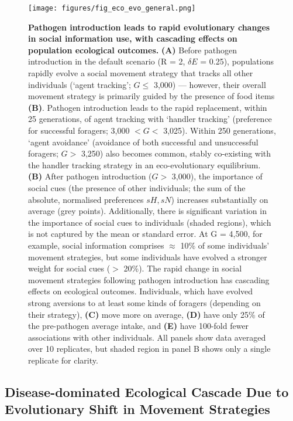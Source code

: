 \begin{figure}[!h]
    \centering
    \texttt{[image: figures/fig\_eco\_evo\_general.png]}
    \caption{
        \textbf{Pathogen introduction leads to rapid evolutionary changes in social information use, with cascading effects on population ecological outcomes.}
        \textbf{(A)} Before pathogen introduction in the default scenario (R = 2, $\delta E$ = 0.25), populations rapidly evolve a social movement strategy that tracks all other individuals (`agent tracking'; $G \leq$ 3,000) --- however, their overall movement strategy is primarily guided by the presence of food items \textbf{(B)}.
        Pathogen introduction leads to the rapid replacement, within 25 generations, of agent tracking with `handler tracking' (preference for successful foragers; 3,000 $< G <$ 3,025). 
        Within 250 generations, `agent avoidance' (avoidance of both successful and unsuccessful foragers; $G >$ 3,250) also becomes common, stably co-existing with the handler tracking strategy in an eco-evolutionary equilibrium.
        \textbf{(B)} After pathogen introduction ($G >$ 3,000), the importance of social cues (the presence of other individuals; the sum of the absolute, normalised preferences $sH, sN$) increases substantially on average (grey points).
        Additionally, there is significant variation in the importance of social cues to individuals (shaded regions), which is not captured by the mean or standard error.
        At G = 4,500, for example, social information comprises $\approx$ 10\% of some individuals' movement strategies, but some individuals have evolved a stronger weight for social cues ($>$ 20\%).
        The rapid change in social movement strategies following pathogen introduction has cascading effects on ecological outcomes.
        Individuals, which have evolved strong aversions to at least some kinds of foragers (depending on their strategy), \textbf{(C)} move more on average, \textbf{(D)} have only 25\% of the pre-pathogen average intake, and \textbf{(E)} have 100-fold fewer associations with other individuals.
        All panels show data averaged over 10 replicates, but shaded region in panel B shows only a single replicate for clarity.
    }
    \label{fig_eco_evo_general}
\end{figure}

\subsection*{Disease-dominated Ecological Cascade Due to Evolutionary Shift in Movement Strategies}

